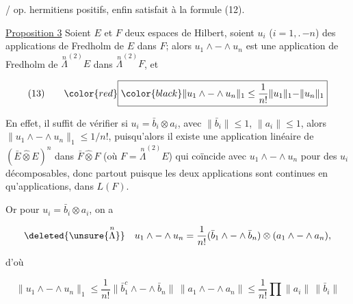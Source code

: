 / op. hermitiens positifs, enfin satisfait à la formule (12).


\uline{Proposition 3} Soient $E$ et $F$ deux espaces de Hilbert, soient $u_i$ ($i=1,\mathord{.}\,\mathord{-}n$) des applications de Fredholm de $E$ dans $F$; alors $u_1\wedge\mathord{-}\wedge u_n$ est une application de Fredholm de $\overset{n}{\Lambda}^{(2)}E$ dans $\overset{n}{\Lambda}^{(2)}F$, et
\reversemarginpar{}\normalmarginpar

\[
\begin{array}{@{}l@{\qquad}l@{}}
(13) & {\color{red}\boxed{\color{black}\displaystyle \lVert u_1\wedge\mathord{-}\wedge u_n\rVert_1\leq\frac1{n!}\lVert u_1\rVert_1\mathord{-}\lVert u_n\rVert_1}}
\end{array}
\]

En effet, il suffit de \deleted{\unsure{$\leq$}} vérifier  si  $u_i=\bar b_i\otimes a_i$,  avec $\lVert\bar b_i\rVert\leq1$, $\lVert a_i\rVert\leq1$, alors $\lVert u_1\wedge\mathord{-}\wedge u_n\rVert_1\leq1/n!$,  puisqu'alors il existe une application  linéaire   de $(\bar E\widehat{\otimes}E)^n$ dans  $\bar F\widehat{\otimes}F$ (où $F=\overset{n}{\Lambda}^{(2)}E$) qui coïncide avec  $u_1\wedge\mathord{-}\wedge u_n$ pour des $u_i$ décomposables, donc partout puisque les deux applications sont continues  en  qu'applications, dans $L(F)$.

Or pour $u_i=\bar b_i\otimes a_i$, on a

\[
\deleted{\unsure{\overset{n}{\Lambda}}}\quad u_1\wedge\mathord{-}\wedge u_n=\frac1{n!}(\bar b_1\wedge\mathord{-}\wedge\bar b_n)\otimes(a_1\wedge\mathord{-}\wedge a_n),
\]

 d'où

\[
\lVert u_1\wedge\mathord{-}\wedge u_n\rVert_1\leq\frac1{n!}\lVert\bar b_1^c\wedge\mathord{-}\wedge\bar b_n\rVert\,\lVert a_1\wedge\mathord{-}\wedge a_n\rVert\leq\frac1{n!}\prod\lVert a_i\rVert\,\lVert\bar b_i\rVert
\]

